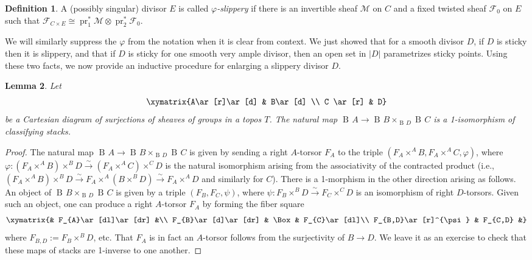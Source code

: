 \documentclass[11pt]{amsart}
\newcommand{\ms}[1]{\mathscr #1}
\newcommand{\simto}{\stackrel{\sim}{\to}}
\renewcommand{\phi}{\varphi}
\DeclareMathOperator{\pr}{pr}
\renewcommand{\[}{[\!\hspace{0.03em}[}
\renewcommand{\]}{]\!\hspace{0.03em}]}
\renewcommand{\(}{(\!\hspace{0.03em}(}
\renewcommand{\)}{)\!\hspace{0.03em})}
\DeclareMathOperator*{\tensor}{\otimes}
\DeclareMathOperator{\B}{\operatorname{B\!}}
\newtheorem{lem}{Lemma}[subsubsection]%
\theoremstyle{definition}
\newtheorem{defn}[lem]{Definition}
\theoremstyle{remark}
\begin{document}
\begin{defn} A (possibly singular) divisor $E$ is called \emph{$\phi$-slippery\/} if 
there is an invertible sheaf $\ms M$ on $C$ and a fixed twisted sheaf $\ms 
F_{0}$ on $E$ such that $\ms F_{C\times E}\cong\pr_{1}^{\ast}\ms M\tensor\pr_{2}^{\ast}\ms 
F_{0}$.  
\end{defn}
We will similarly suppress the $\phi$ from the notation when it is clear from context.  We just showed that for a smooth divisor $D$, if $D$ is sticky then it is slippery, and that if $D$ is sticky for one smooth very ample divisor, 
then an open set in $|D|$ parametrizes sticky points.  Using these two facts, we now provide an 
inductive procedure for enlarging a slippery divisor $D$.  

\begin{lem}\label{L:abstract gluing} Let 
    $$\xymatrix{A\ar[r]\ar[d] & B\ar[d] \\
    C \ar[r] & D}$$
be a Cartesian diagram of surjections of sheaves of groups in a topos $T$.  The 
natural map $\B{A}\to\B{B}\times_{\B{D}}\B{C}$ is a 1-isomorphism of 
classifying stacks.
\end{lem}
\begin{proof} The natural map $\B{A}\to\B{B}\times_{\B{D}}\B{C}$ is 
given by sending a right $A$-torsor $F_{A}$ to the triple 
$(F_{A}\times^{A}B,F_{A}\times^{A}C,\phi)$, where 
$\phi:(F_{A}\times^{A}B)\times^{B}D\simto(F_{A}\times^{A}C)\times^{C}D$ 
is the natural isomorphism arising from the associativity of the 
contracted product (i.e., $(F_{A}\times^{A}B)\times^{B}D\simto 
F_{A}\times^{A}(B\times^{B}D)\simto F_{A}\times^{A}D$ and similarly 
for $C$).  There is a 1-morphism in the other direction arising as 
follows.  An object of $\B{B}\times_{\B{D}}\B{C}$ is given by a triple 
$(F_{B},F_{C},\psi)$, where $\psi:F_{B}\times^{B}D\simto 
F_{C}\times^{C}D$ is an isomorphism of right $D$-torsors.  Given such 
an object, one can produce a right $A$-torsor $F_A$ by forming the 
fiber square 
$$\xymatrix{& F_{A}\ar[dl]\ar[dr] &\\
F_{B}\ar[d]\ar[dr] & \Box & F_{C}\ar[dl]\\
F_{B,D}\ar[r]^{\psi} & F_{C,D} &}$$
where $F_{B,D}:=F_{B}\times^{B}D$, etc.  That $F_{A}$ is in fact an 
$A$-torsor follows from the surjectivity of $B\to D$.  We leave it as an exercise to  
check that these maps of stacks are 1-inverse to one another.
\end{proof}
\end{document}
